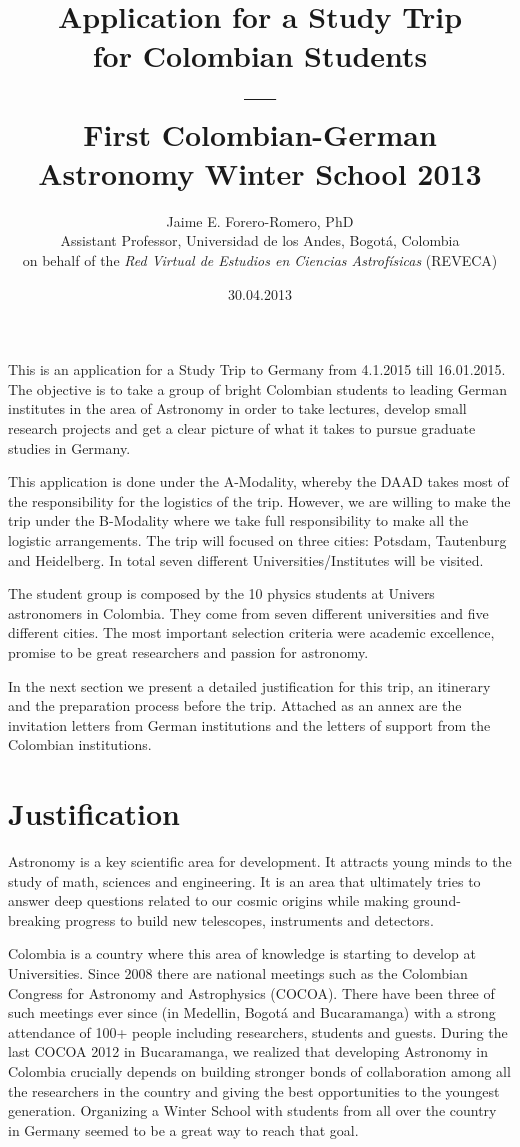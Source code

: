 \documentclass[12pt]{article}
\title{Application for a Study Trip \\ for Colombian
  Students\\---\\ First Colombian-German \\ Astronomy Winter School 2013}
\author{Jaime E. Forero-Romero, PhD \\ {\small Assistant Professor, Universidad de los Andes, Bogot\'a, Colombia}\\
{\small on behalf of the {\textit{Red Virtual de Estudios en Ciencias Astrof\'isicas}} (REVECA)}}
\date{30.04.2013}
\begin{document}
\maketitle
This is an application for a Study Trip to Germany from 4.1.2015 till
16.01.2015. The objective is to take a group of bright Colombian students to
leading German institutes in the area of Astronomy in order to take lectures,
develop small research projects and get a clear picture of what it
takes to pursue graduate studies in Germany. 

This application is done under the A-Modality, whereby the DAAD takes
most of the responsibility for the logistics of the trip. However, we
are willing to make the trip under the B-Modality where we take full
responsibility to make all the logistic arrangements. The trip will
focused on three cities: Potsdam, Tautenburg and Heidelberg. In total
seven different Universities/Institutes will be visited.

The student group is composed by the 10 physics students at Univers
astronomers in Colombia. They come from seven different universities
and five different cities. The most important selection criteria were
academic excellence, promise to be great researchers and passion for
astronomy.  

In the next section we present a detailed justification for this trip,
an itinerary and the preparation process before the trip. Attached as
an annex are the invitation letters from German institutions and the
letters of support from the Colombian institutions.  

\newpage

\section{Justification}

Astronomy is a key scientific area for development. It attracts young
minds to the study of math, sciences and engineering. It is an area
that ultimately tries to answer deep questions related to our
cosmic origins while making ground-breaking progress to build new
telescopes, instruments and detectors.

Colombia is a country where this area of knowledge is starting to develop
at Universities. Since 2008 there are national meetings such as the
Colombian Congress for Astronomy and Astrophysics (COCOA). There have
been three of such meetings ever since (in Medellin, Bogot\'a and Bucaramanga)
with a strong attendance of 100+ people including researchers, students and guests. During the
last COCOA 2012 in Bucaramanga, we realized that developing Astronomy
in Colombia crucially depends on building stronger bonds of
collaboration among all the researchers in the country and giving the
best opportunities to the youngest generation. Organizing a Winter School
with students from all over the country in Germany seemed to be a
great way to reach that goal. 
\end{document}
